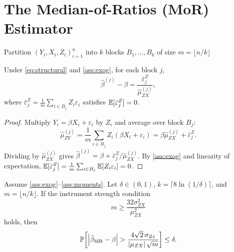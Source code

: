 \section{The Median-of-Ratios (MoR) Estimator}
\label{sec:mor}

\begin{algorithm}[H]
\label{alg:mor}
\caption{Median-of-Ratios Estimator}

Partition $(Y_i,X_i,Z_i)_{i=1}^{n}$ into $k$ blocks $B_1, \dots, B_k$ of size $m = \lfloor n/k \rfloor$\;


\;
\end{algorithm}

\begin{lemma}
\label{lem:mor_decomp}
Under \eqref{eq:structural} and \ref{ass:exog}, for each block $j$,
\begin{equation}
\label{eq:block_error}
    \hat{\beta}^{(j)} - \beta = \frac{\bar{\varepsilon}_j^Z}{\hat{\mu}_{ZX}^{(j)}},
\end{equation}
where $\bar{\varepsilon}_j^Z = \frac{1}{m}\sum_{i \in B_j}Z_i\varepsilon_i$ satisfies $\operatorname{\mathbb{E}}[\bar{\varepsilon}_j^Z] = 0$.
\end{lemma}

\begin{proof}
Multiply $Y_i = \beta X_i + \varepsilon_i$ by $Z_i$ and average over block $B_j$:
\[
    \hat{\mu}_{ZY}^{(j)} = \frac{1}{m}\sum_{i \in B_j}Z_i(\beta X_i + \varepsilon_i) = \beta\hat{\mu}_{ZX}^{(j)} + \bar{\varepsilon}_j^Z.
\]
Dividing by $\hat{\mu}_{ZX}^{(j)}$ gives $\hat{\beta}^{(j)} = \beta + \bar{\varepsilon}_j^Z/\hat{\mu}_{ZX}^{(j)}$. By \ref{ass:exog} and linearity of expectation, $\operatorname{\mathbb{E}}[\bar{\varepsilon}_j^Z] = \frac{1}{m}\sum_{i \in B_j}\operatorname{\mathbb{E}}[Z_i\varepsilon_i] = 0$.
\end{proof}

\begin{theorem}
\label{thm:mor}
Assume \ref{ass:exog}--\ref{ass:moments}. Let $\delta \in (0,1)$, $k = \lceil 8\ln(1/\delta) \rceil$, and $m = \lfloor n/k \rfloor$. If the instrument strength condition
\begin{equation}
\label{eq:mor_strength}
    m \geq \frac{32\sigma_{ZX}^2}{\mu_{ZX}^2}
\end{equation}
holds, then
\begin{equation}
\label{eq:mor_bound}
    \operatorname{\mathbb{P}}\!\left[\left|\hat{\beta}_{\mathrm{MR}} - \beta\right| > \frac{4\sqrt{2}\,\sigma_{Z\varepsilon}}{\left|\mu_{ZX}\right|\sqrt{m}}\right] \leq \delta.
\end{equation}
\end{theorem}


